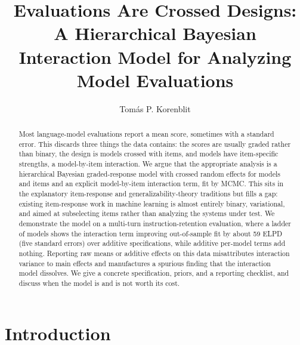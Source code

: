 \documentclass{llncs}
\begin{document}
\title{Evaluations Are Crossed Designs: A Hierarchical Bayesian
Interaction Model for Analyzing Model Evaluations}
\author{Tom\'as P. Korenblit}
\maketitle

\begin{abstract}
Most language-model evaluations report a mean score, sometimes with a
standard error. This discards three things the data contains: the scores
are usually graded rather than binary, the design is models crossed with
items, and models have item-specific strengths, a model-by-item
interaction. We argue that the appropriate analysis is a hierarchical
Bayesian graded-response model with crossed random effects for models and
items and an explicit model-by-item interaction term, fit by MCMC. This sits
in the explanatory item-response and generalizability-theory traditions but
fills a gap: existing item-response work in machine learning is almost
entirely binary, variational, and aimed at subselecting items rather than
analyzing the systems under test. We demonstrate the model on a
multi-turn instruction-retention evaluation, where a ladder of models shows
the interaction term improving out-of-sample fit by about 59 ELPD (five
standard errors) over additive specifications, while additive per-model
terms add nothing. Reporting raw means or additive effects on this data
misattributes interaction variance to main effects and manufactures a
spurious finding that the interaction model dissolves. We give a concrete
specification, priors, and a reporting checklist, and discuss when the model
is and is not worth its cost.
\end{abstract}

\section{Introduction}
\label{sec:intro}
\end{document}

